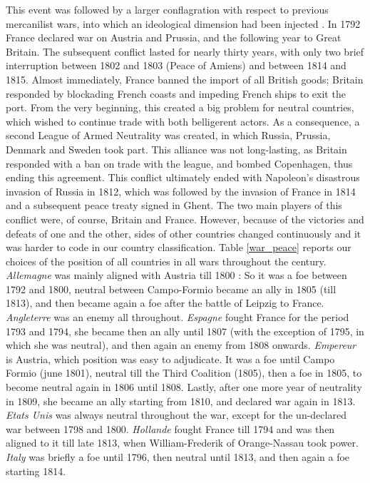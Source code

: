 \documentclass[12pt,a4paper,notitlepage,english]{article}
\begin{document}
This event was followed by a larger conflagration with respect to previous mercanilist wars, into which an ideological dimension had been injected \citep{o2006worldwide}.
In 1792 France declared war on Austria and Prussia, and the following year to Great Britain.
The subsequent conflict lasted for nearly thirty years, with only two brief interruption between 1802 and 1803 (Peace of Amiens) and between 1814 and 1815.
Almost immediately, France banned the import of all British goods; Britain responded by blockading French coasts and impeding French ships to exit the port.
From the very beginning, this created a big problem for neutral countries, which wished to continue trade with both belligerent actors.
As a consequence, a second League of Armed Neutrality was created, in which Russia, Prussia, Denmark and Sweden took part.
This alliance was not long-lasting, as Britain responded with a ban on trade with the league, and bombed Copenhagen, thus ending this agreement.
This conflict ultimately ended with Napoleon's disastrous invasion of Russia in 1812, which was followed by the invasion of France in 1814 and a subsequent peace treaty signed in Ghent.
The two main players of this conflict were, of course, Britain and France.
However, because of the victories and defeats of one and the other, sides of other countries changed continuously and it was harder to code in our country classification. Table \ref{war_peace} reports our choices of the position of all countries in all wars throughout the century.
\textit{Allemagne} was mainly aligned with Austria till 1800 : So it was a foe between 1792 and 1800, neutral between Campo-Formio became an ally in 1805 (till 1813), and then became again a foe after the battle of Leipzig to France.
\textit{Angleterre} was an enemy all throughout.
\textit{Espagne} fought France for the period 1793 and 1794, she became then an ally until 1807 (with the exception of 1795, in which she was neutral), and then again an enemy from 1808 onwards.
\textit{Empereur} is Austria, which position was easy to adjudicate. It was a foe until Campo Formio (june 1801), neutral till the Third Coalition (1805), then a foe in 1805, to become neutral again in 1806 until 1808.
Lastly, after one more year of neutrality in 1809, she became an ally starting from 1810, and declared war again in 1813.
\textit{Etats Unis} was always neutral throughout the war, except for the un-declared war between 1798 and 1800.
\textit{Hollande} fought France till 1794 and was then aligned to it till late 1813, when William-Frederik of Orange-Nassau took power.
\textit{Italy} was briefly a foe until 1796, then neutral until 1813, and then again a foe starting 1814.
\end{document}
